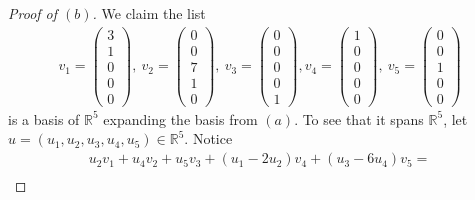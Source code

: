 \documentclass[11pt]{extarticle}
\newcommand{\R}{\mathbb{R}}
\begin{document}
\begin{proof}[Proof of $(b)$]
We claim the list 
\begin{align*}
v_1 = \begin{pmatrix}3\\1\\0\\0\\0\end{pmatrix}, ~ v_2 = \begin{pmatrix}0\\0\\7\\1\\0\end{pmatrix}, ~ v_3 = \begin{pmatrix}0\\0\\0\\0\\1\end{pmatrix}, v_4 = \begin{pmatrix}1\\0\\0\\0\\0\end{pmatrix}, ~v_5 = \begin{pmatrix}0\\0\\1\\0\\0\end{pmatrix}
\end{align*}
is a basis of $\R^5$ expanding the basis from $(a)$.  To see that it spans $\R^5$, let $u=(u_1,u_2,u_3,u_4,u_5)\in\R^5$.  Notice 
\begin{multline*}
u_2v_1 + u_4v_2 + u_5v_3+ (u_1 - 2u_2)v_4 + (u_3 - 6u_4)v_5 = \\

\end{multline*}
\end{proof}
\end{document}
